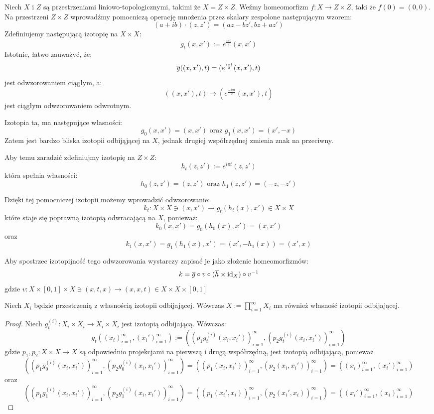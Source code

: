 \begin{ex} \label{rip-space}
  Niech $X$ i $Z$ są przestrzeniami liniowo-topologicznymi, takimi że $X = Z \times Z$. Weźmy homeomorfizm $f: X \rightarrow Z \times Z$, taki że $f(0) = (0,0)$. Na przestrzeni $Z \times Z$ wprowadźmy pomocniczą operację mnożenia przez skalary zespolone następującym wzorem:
  $$(a+ib) \cdot (z, z') = (az - bz', bz + az')$$
  Zdefiniujemy następującą izotopię na $X \times X$:
  $$g_t(x,x') := e^{\frac{i \pi t}{2}} (x, x')$$
  Istotnie, łatwo zauważyć, że:
  $$\overline{g}((x,x'), t) = (e^{\frac{i\pi t}{2}}(x,x'), t)$$
  jest odwzorowaniem ciągłym, a:
  $$((x,x'),t) \rightarrow (e^{\frac{-i\pi t}{2}}(x,x'),t)$$
  jest ciągłym odwzorowaniem odwrotnym.
  
  Izotopia ta, ma następujące własności:
  $$g_0(x,x') = (x,x') \mbox{ oraz } g_1(x,x') = (x', -x)$$
  Zatem jest bardzo bliska izotopii odbijąjącej na $X$, jednak drugiej współrzędnej zmienia znak na przeciwny.
  
  Aby temu zaradzić zdefiniujmy izotopię na $Z \times Z$:
  $$h_t(z,z') := e^{i \pi t}(z, z')$$
  która spełnia własności:
  $$h_0(z,z') = (z,z') \mbox{ oraz } h_1(z,z') = (-z,-z')$$
  
  Dzięki tej pomocniczej izotopii możemy wprowadzić odwzorowanie:
  $$k_t: X \times X \ni (x, x') \rightarrow g_t(h_t(x), x') \in X \times X$$ 
  które staje się poprawną izotopią odwracającą na $X$, ponieważ:
  $$k_0(x,x') = g_0(h_0(x), x') = (x, x')$$
  oraz
  $$k_1(x,x') = g_1(h_1(x), x') = (x', -h_1(x)) = (x', x)$$
  
  Aby spostrzec izotopijność tego odwzorowania wystarczy zapisać je jako złożenie homeomorfizmów:
  $$k = \overline{g} \circ v \circ (\overline{h} \times \mbox{id}_X) \circ v^{-1}$$
  gdzie $v: X \times [0,1] \times X \ni (x, t, x) \rightarrow (x, x, t) \in X \times X \times [0,1]$
\end{ex}

\begin{ex} \label{rip-product}
  Niech $X_i$ będzie przestrzenią z własnością izotopii odbijającej. Wówczas $X := \prod_{i=1}^\infty X_i$ ma również własność izotopii odbijającej.
  \begin{proof}
    Niech $g_t^{(i)}: X_i \times X_i \rightarrow X_i \times X_i$ jest izotopią odbijającą.
    Wówczas:
    $$g_t((x_i)_{i=1}^\infty, (x_i')_{i=1}^\infty) := ((p_1 g_t^{(i)}(x_i, x_i'))_{i=1}^\infty, (p_2 g_t^{(i)}(x_i, x_i'))_{i=1}^\infty)$$
    gdzie $p_1, p_2: X \times X \rightarrow X$ są odpowiednio projekcjami na pierwszą i drugą współrzędną, jest izotopią odbijającą, ponieważ
    $$((p_1 g_0^{(i)}(x_i, x_i'))_{i=1}^\infty, (p_2 g_0^{(i)}(x_i, x_i'))_{i=1}^\infty) = ((p_1 (x_i, x_i'))_{i=1}^\infty, (p_2 (x_i, x_i'))_{i=1}^\infty) = ((x_i)_{i=1}^\infty, (x_i')_{i=1}^\infty)$$
    oraz 
    $$((p_1 g_1^{(i)}(x_i, x_i'))_{i=1}^\infty, (p_2 g_1^{(i)}(x_i, x_i'))_{i=1}^\infty) = ((p_1 (x_i', x_i))_{i=1}^\infty, (p_2 (x_i', x_i))_{i=1}^\infty) = ((x_i')_{i=1}^\infty, (x_i)_{i=1}^\infty)$$
  \end{proof}
\end{ex}

